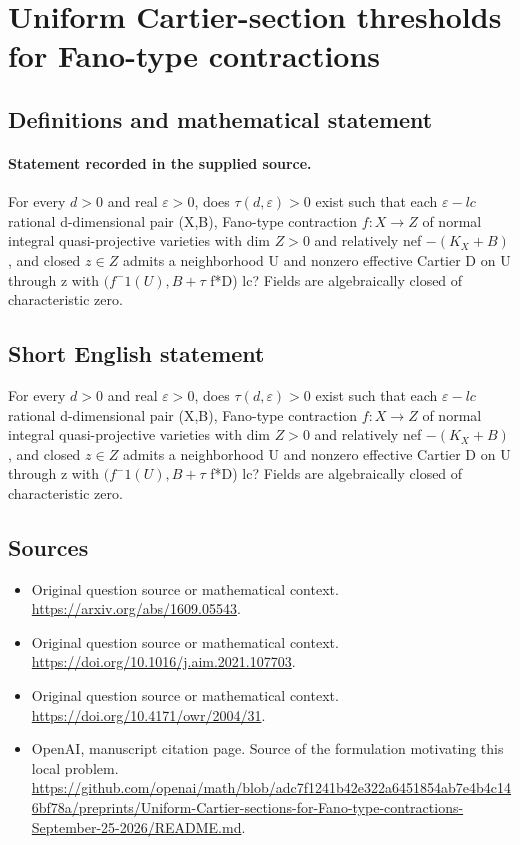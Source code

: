 \documentclass[11pt]{article}
\begin{document}
\section*{Uniform Cartier-section thresholds for Fano-type contractions}\label{statement}
\subsection{Definitions and mathematical statement}
\paragraph{Statement recorded in the supplied source.}
For every $d>0$ and real $\varepsilon >0$, does $\tau (d,\varepsilon )>0$ exist such that each $\varepsilon -lc$ rational d-dimensional pair (X,B), Fano-type contraction $f:X\to Z$ of normal integral quasi-projective varieties with dim $Z>0$ and relatively nef $-(K_X+B)$, and closed $z\in Z$ admits a neighborhood U and nonzero effective Cartier D on U through z with $(f^-1(U),B+\tau $ f*D) lc? Fields are algebraically closed of characteristic zero.
\subsection{Short English statement}
For every $d>0$ and real $\varepsilon >0$, does $\tau (d,\varepsilon )>0$ exist such that each $\varepsilon -lc$ rational d-dimensional pair (X,B), Fano-type contraction $f:X\to Z$ of normal integral quasi-projective varieties with dim $Z>0$ and relatively nef $-(K_X+B)$, and closed $z\in Z$ admits a neighborhood U and nonzero effective Cartier D on U through z with $(f^-1(U),B+\tau $ f*D) lc? Fields are algebraically closed of characteristic zero.
\subsection{Sources}
\begin{itemize}
\item[S1] Original question source or mathematical context.
\url{https://arxiv.org/abs/1609.05543}.
\item[S2] Original question source or mathematical context.
\url{https://doi.org/10.1016/j.aim.2021.107703}.
\item[S3] Original question source or mathematical context.
\url{https://doi.org/10.4171/owr/2004/31}.
\item[S4] OpenAI, manuscript citation page. Source of the formulation motivating this local problem.
\url{https://github.com/openai/math/blob/adc7f1241b42e322a6451854ab7e4b4c146bf78a/preprints/Uniform-Cartier-sections-for-Fano-type-contractions-September-25-2026/README.md}.
\end{itemize}
\end{document}
